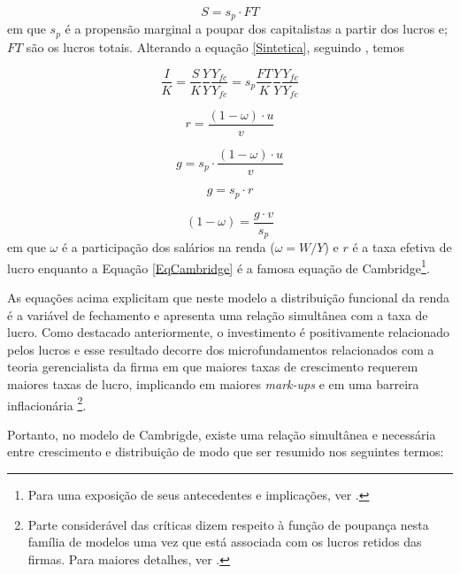 $$
S = s_p\cdot FT
$$
em que $s_p$ é a propensão marginal a poupar dos capitalistas a partir dos lucros e; $FT$ são os lucros totais. Alterando a equação \ref{Sintetica}, seguindo \textcite{serrano_trouble_2017}, temos

$$
\frac{I}{K} = \frac{S}{K}\frac{Y}{Y}\frac{Y_{fc}}{Y_{fc}} = s_p\frac{FT}{K}\frac{Y}{Y}\frac{Y_{fc}}{Y_{fc}}
$$

\begin{equation}
\label{LucroCambridge}
r = \frac{(1-\omega)\cdot u}{v}
\end{equation}

\begin{equation}
\label{Sintetica}
g = s_p\cdot \frac{(1-\omega)\cdot u}{v}
\end{equation}

\begin{equation}
\label{EqCambridge}
g = s_p\cdot r
\end{equation}

\begin{equation}
\label{Cambridge}
(1-\omega) = \frac{g\cdot v}{s_p}
\end{equation}
em que $\omega$ é a participação dos salários na renda ($\omega = W/Y$) e $r$ é a taxa efetiva de lucro enquanto a Equação \ref{EqCambridge} é a famosa equação de Cambridge\footnote{
	Para uma exposição de seus antecedentes e implicações, ver \textcite{bortis_notes_1993}.
}.


As equações acima explicitam que neste modelo a distribuição funcional da renda é a variável de fechamento  e apresenta uma relação simultânea com a taxa de lucro. Como destacado anteriormente, o investimento é positivamente relacionado pelos lucros e esse resultado decorre dos microfundamentos relacionados com a teoria gerencialista da firma em que maiores taxas de crescimento requerem maiores taxas de lucro, implicando em maiores \textit{mark-ups} e em uma barreira inflacionária \cite[p.~353]{lavoie_post-keynesian_2015} \footnote{Parte considerável das críticas dizem respeito à função de poupança nesta família de modelos uma vez que está associada com os lucros retidos das firmas. Para maiores detalhes, ver  \textcites[Seção III]{skott_kaldoriansaving_1981}{marglin_foundation_1984}{skott_kaldors_1989}.}. 


Portanto, no modelo de Cambrigde, existe uma relação simultânea e necessária entre crescimento e distribuição de modo que ser resumido nos seguintes termos:

